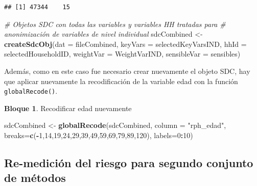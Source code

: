 \documentclass[]{book}
\newenvironment{Shaded}{\begin{snugshade}}{\end{snugshade}}
\newcommand{\CommentTok}[1]{\textcolor[rgb]{0.56,0.35,0.01}{\textit{#1}}}
\newcommand{\DataTypeTok}[1]{\textcolor[rgb]{0.13,0.29,0.53}{#1}}
\newcommand{\DecValTok}[1]{\textcolor[rgb]{0.00,0.00,0.81}{#1}}
\newcommand{\KeywordTok}[1]{\textcolor[rgb]{0.13,0.29,0.53}{\textbf{#1}}}
\newcommand{\NormalTok}[1]{#1}
\newcommand{\OperatorTok}[1]{\textcolor[rgb]{0.81,0.36,0.00}{\textbf{#1}}}
\newcommand{\StringTok}[1]{\textcolor[rgb]{0.31,0.60,0.02}{#1}}
\theoremstyle{definition}
\theoremstyle{definition}
\newtheorem{example}{Bloque}[chapter]
\theoremstyle{definition}
\theoremstyle{definition}
\theoremstyle{remark}
\begin{document}
\begin{verbatim}
## [1] 47344    15
\end{verbatim}

\begin{Shaded}
\begin{Highlighting}[]
\CommentTok{# Objetos SDC con todas las variables y variables HH tratadas para}
\CommentTok{# anonimización de variables de nivel individual}
\NormalTok{sdcCombined <-}\StringTok{ }\KeywordTok{createSdcObj}\NormalTok{(}\DataTypeTok{dat =}\NormalTok{ fileCombined, }\DataTypeTok{keyVars =}\NormalTok{ selectedKeyVarsIND,}
                            \DataTypeTok{hhId =}\NormalTok{ selectedHouseholdID, }\DataTypeTok{weightVar =}\NormalTok{ WeightVarIND,}
                            \DataTypeTok{sensibleVar =}\NormalTok{ sensibles)}
\end{Highlighting}
\end{Shaded}

Además, como en este caso fue necesario crear nuevamente el objeto SDC, hay que aplicar nuevamente la recodificación de la variable edad con la función \texttt{globalRecode()}.

\begin{example}
\protect\hypertarget{exm:bloque59nbm}{}{\label{exm:bloque59nbm} }Recodificar edad nuevamente
\end{example}

\begin{Shaded}
\begin{Highlighting}[]
\NormalTok{sdcCombined <-}\StringTok{ }\KeywordTok{globalRecode}\NormalTok{(sdcCombined,}
                            \DataTypeTok{column =} \StringTok{"rph_edad"}\NormalTok{,}
                            \DataTypeTok{breaks=}\KeywordTok{c}\NormalTok{(}\OperatorTok{-}\DecValTok{1}\NormalTok{,}\DecValTok{14}\NormalTok{,}\DecValTok{19}\NormalTok{,}\DecValTok{24}\NormalTok{,}\DecValTok{29}\NormalTok{,}\DecValTok{39}\NormalTok{,}\DecValTok{49}\NormalTok{,}\DecValTok{59}\NormalTok{,}\DecValTok{69}\NormalTok{,}\DecValTok{79}\NormalTok{,}\DecValTok{89}\NormalTok{,}\DecValTok{120}\NormalTok{),}
                            \DataTypeTok{labels=}\DecValTok{0}\OperatorTok{:}\DecValTok{10}\NormalTok{)}
\end{Highlighting}
\end{Shaded}

\hypertarget{re-mediciuxf3n-del-riesgo-para-segundo-conjunto-de-muxe9todos}{%
\subsection{Re-medición del riesgo para segundo conjunto de métodos}\label{re-mediciuxf3n-del-riesgo-para-segundo-conjunto-de-muxe9todos}}
\end{document}
